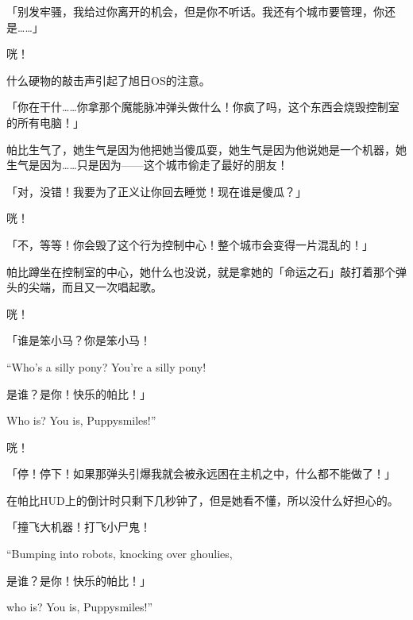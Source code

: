 「别发牢骚，我给过你离开的机会，但是你不听话。我还有个城市要管理，你还是……」

咣！

什么硬物的敲击声引起了旭日OS的注意。

「你在干什……你拿那个魔能脉冲弹头做什么！你疯了吗，这个东西会烧毁控制室的所有电脑！」

帕比生气了，她生气是因为他把她当傻瓜耍，她生气是因为他说她是一个机器，她生气是因为……只是因为——这个城市偷走了最好的朋友！

「对，没错！我要为了正义让你回去睡觉！现在谁是傻瓜？」

咣！

「不，等等！你会毁了这个行为控制中心！整个城市会变得一片混乱的！」

帕比蹲坐在控制室的中心，她什么也没说，就是拿她的「命运之石」敲打着那个弹头的尖端，而且又一次唱起歌。

咣！

\begin{song}
「谁是笨小马？你是笨小马！


\begin{englishlyric}
    ``Who's a silly pony? You're a silly pony!
\end{englishlyric}

\medskip

是谁？是你！快乐的帕比！」


\begin{englishlyric}
    Who is? You is, Puppysmiles!''
\end{englishlyric}
\end{song}

咣！

「停！停下！如果那弹头引爆我就会被永远困在主机之中，什么都不能做了！」

在帕比HUD上的倒计时只剩下几秒钟了，但是她看不懂，所以没什么好担心的。

\begin{song}
「撞飞大机器！打飞小尸鬼！


\begin{englishlyric}
    ``Bumping into robots, knocking over ghoulies,
\end{englishlyric}

\medskip

是谁？是你！快乐的帕比！」


\begin{englishlyric}
    who is? You is, Puppysmiles!''
\end{englishlyric}
\end{song}

